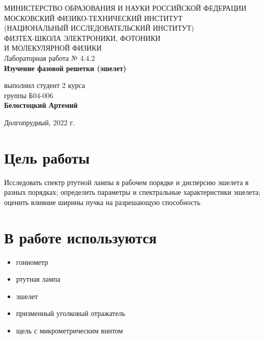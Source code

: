 \documentclass[a4paper,12pt]{article}
\begin{document}
 
\begin{titlepage}
	\begin{center}
		\large 	МИНИСТЕРСТВО ОБРАЗОВАНИЯ И НАУКИ РОССИЙСКОЙ ФЕДЕРАЦИИ\\
				МОСКОВСКИЙ ФИЗИКО-ТЕХНИЧЕСКИЙ ИНСТИТУТ \\
				(НАЦИОНАЛЬНЫЙ ИССЛЕДОВАТЕЛЬСКИЙ ИНСТИТУТ)\\ 
				ФИЗТЕХ-ШКОЛА ЭЛЕКТРОНИКИ, ФОТОНИКИ \\
				И МОЛЕКУЛЯРНОЙ ФИЗИКИ \\
		
		
		\vspace{4.0 cm}
		Лабораторная работа № 4.4.2 \\ 
		\LARGE \textbf{Изучение фазовой решетки (эшелет)}
	\end{center}
	\vspace{3 cm} \large
	
	\begin{flushright}
		выполнил студент 2 курса \\
		{группы Б04-006}\\
		\textbf{Белостоцкий Артемий}\\
	\end{flushright}
	
	\vfill

	\begin{center}
	Долгопрудный, 2022 г.
	\end{center}
\end{titlepage}                                                                      
 
\section*{Цель работы} 
 Исследовать спектр ртутной лампы в рабочем порядке и дисперсию эшелета в разных порядках; определить параметры и спектральные характеристики эшелета; оценить влияние ширины пучка на разрешающую способность

\section*{В работе используются}
	\begin{itemize}
		\item гониометр
		\item ртутная лампа
		\item эшелет 
		\item призменный уголковый отражатель 
		\item щель с микрометрическим винтом
	\end{itemize}
 
\end{document}
